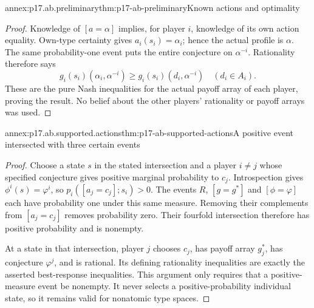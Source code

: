 \begin{annexitem}{annex:p17.ab.preliminary}{thm:p17-ab-preliminary}{Known actions and optimality}
\begin{proof}
Knowledge of \([a=\alpha]\) implies, for player \(i\), knowledge
of its own action equality. Own-type certainty gives
\(a_i(s_i)=\alpha_i\); hence the actual profile is \(\alpha\).
The same probability-one event puts the entire conjecture on
\(\alpha^{-i}\). Rationality therefore says
\[
 g_i(s_i)(\alpha_i,\alpha^{-i})
       \geq g_i(s_i)(d_i,\alpha^{-i})\quad(d_i\in A_i).
\]
These are the pure Nash inequalities for the actual payoff array
of each player, proving the result. No belief about the other
players' rationality or payoff arrays was used.
\end{proof}
\end{annexitem}

\begin{annexitem}{annex:p17.ab.supported.actions}{thm:p17-ab-supported-actions}{A positive event intersected with three certain events}
\begin{proof}
Choose a state \(s\) in the stated intersection and a player
\(i\ne j\) whose specified conjecture gives positive marginal
probability to \(c_j\). Introspection gives
\(\phi^i(s)=\varphi^i\), so \(p_i([a_j=c_j];s_i)>0\).
The events \(R\), \([g=g^*]\) and \([\phi=\varphi]\) each have
probability one under this same measure. Removing their
complements from \([a_j=c_j]\) removes probability zero.
Their fourfold intersection therefore has positive probability
and is nonempty.

At a state in that intersection, player \(j\) chooses \(c_j\),
has payoff array \(g_j^*\), has conjecture \(\varphi^j\),
and is rational. Its defining rationality inequalities are exactly
the asserted best-response inequalities. This argument only
requires that a positive-measure event be nonempty. It never
selects a positive-probability individual state, so it remains
valid for nonatomic type spaces.
\end{proof}
\end{annexitem}

